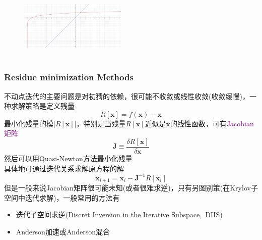 {\begin{minipage}[b]{0.35\textwidth}
\end{minipage}
\hfill
\begin{minipage}[b]{0.62\textwidth}
\begin{figure}[h!]
	\vspace{-0.21in}
\centering
\includegraphics[height=1.3in,width=2.0in,viewport=0 0 2500 1600,clip]{Figures/solve_lg10.png}
\label{solution-log_10}
\end{figure}
\end{minipage}
}

\frame
{
	\frametitle{\textrm{Residue minimization Methods}}
不动点迭代的主要问题是对初猜的依赖，很可能不收敛或线性收敛(收敛缓慢)，一种求解策略是定义残量
	\begin{displaymath}
		R[\mathbf{x}]=f(\mathbf{x})-\mathbf{x}
	\end{displaymath}
	最小化残量的模$|R[\mathbf{x}]|$，特别是当残量$R[\mathbf{x}]$近似是$\mathbf{x}$的线性函数，可有\textcolor{purple}{\textrm{Jacobian}矩阵}
	\begin{displaymath}
		\mathbf{J}\equiv\dfrac{\delta R[\mathbf{x}]}{\delta\mathbf{x}}
	\end{displaymath}
	然后可以用\textrm{Quasi-Newton}方法最小化残量\\具体地可通过迭代关系求解原方程的解
	\begin{displaymath}
		\mathbf{x}_{i+1}=\mathbf{x}_{i}-\mathbf{J}^{-1}R[\mathbf{x}_{i}]
	\end{displaymath}
		但是一般来说\textrm{Jacobian}矩阵很可能未知(或者很难求逆)，只有另图别策(在\textrm{Krylov}子空间中迭代求解)，一般常用的方法有
		\begin{itemize}
			\item 迭代子空间求逆(\textrm{Discret Inversion in the Iterative Subspace,~DIIS})
			\item \textrm{Anderson}加速或\textrm{Anderson}混合
		\end{itemize}
}
	
